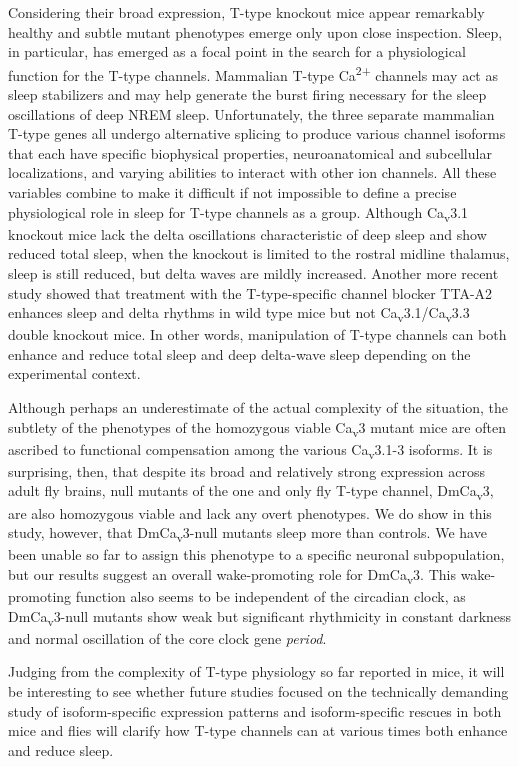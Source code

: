 Considering their broad expression, T-type knockout mice appear remarkably healthy and subtle mutant phenotypes emerge only upon close inspection.
Sleep, in particular, has emerged as a focal point in the search for a physiological function for the T-type channels.
Mammalian T-type Ca\textsuperscript{2+} channels may act as sleep stabilizers and may help generate the burst firing necessary for the sleep oscillations of deep NREM sleep.
Unfortunately, the three separate mammalian T-type genes all undergo alternative splicing to produce various channel isoforms that each have specific biophysical properties, neuroanatomical and subcellular localizations, and varying abilities to interact with other ion channels.
All these variables combine to make it difficult if not impossible to define a precise physiological role in sleep for T-type channels as a group.
Although Ca\textsubscript{v}3.1 knockout mice lack the delta oscillations characteristic of deep sleep and show reduced total sleep\cite{Lee:2004ey}, when the knockout is limited to the rostral midline thalamus, sleep is still reduced, but delta waves are mildly increased\cite{anderson:2005aa}.
Another more recent study showed that treatment with the T-type-specific channel blocker TTA-A2 enhances sleep and delta rhythms in wild type mice but not Ca\textsubscript{v}3.1/Ca\textsubscript{v}3.3 double knockout mice\cite{kraus:2010aa}.
In other words, manipulation of T-type channels can both enhance and reduce total sleep and deep delta-wave sleep depending on the experimental context.

Although perhaps an underestimate of the actual complexity of the situation, the subtlety of the phenotypes of the homozygous viable Ca\textsubscript{v}3 mutant mice are often ascribed to functional compensation among the various Ca\textsubscript{v}3.1-3 isoforms\cite{senatore:2012aa}.
It is surprising, then, that despite its broad and relatively strong expression across adult fly brains, null mutants of the one and only fly T-type channel, DmCa\textsubscript{v}3, are also homozygous viable and lack any overt phenotypes.
We do show in this study, however, that DmCa\textsubscript{v}3-null mutants sleep more than controls.
We have been unable so far to assign this phenotype to a specific neuronal subpopulation, but our results suggest an overall wake-promoting role for DmCa\textsubscript{v}3.
This wake-promoting function also seems to be independent of the circadian clock, as DmCa\textsubscript{v}3-null mutants show weak but significant rhythmicity in constant darkness and normal oscillation of the core clock gene \emph{period}.

Judging from the complexity of T-type physiology so far reported in mice, it will be interesting to see whether future studies focused on the technically demanding study of isoform-specific expression patterns and isoform-specific rescues in both mice and flies will clarify how T-type channels can at various times both enhance and reduce sleep.

  